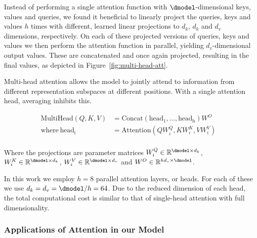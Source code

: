   Instead of performing a single attention function with $\dmodel$-dimensional keys, values and queries, we found it beneficial to linearly project the queries, keys and values $h$ times with different, learned linear projections to $d_k$, $d_k$ and $d_v$ dimensions, respectively.
  On each of these projected versions of queries, keys and values we then perform the attention function in parallel, yielding $d_v$-dimensional output values. These are concatenated and once again projected, resulting in the final values, as depicted in Figure~\ref{fig:multi-head-att}.

  Multi-head attention allows the model to jointly attend to information from different representation subspaces at different positions. With a single attention head, averaging inhibits this.

  \begin{align*}
      \mathrm{MultiHead}(Q, K, V) &= \mathrm{Concat}(\mathrm{head_1}, ..., \mathrm{head_h})W^O\\
      \text{where}~\mathrm{head_i} &= \mathrm{Attention}(QW^Q_i, KW^K_i, VW^V_i)\\
  \end{align*}

  Where the projections are parameter matrices $W^Q_i \in \mathbb{R}^{\dmodel \times d_k}$, $W^K_i \in \mathbb{R}^{\dmodel \times d_k}$, $W^V_i \in \mathbb{R}^{\dmodel \times d_v}$ and $W^O \in \mathbb{R}^{hd_v \times \dmodel}$.

  In this work we employ $h=8$ parallel attention layers, or heads. For each of these we use $d_k=d_v=\dmodel/h=64$.
  Due to the reduced dimension of each head, the total computational cost is similar to that of single-head attention with full dimensionality.

  \subsubsection{Applications of Attention in our Model}

